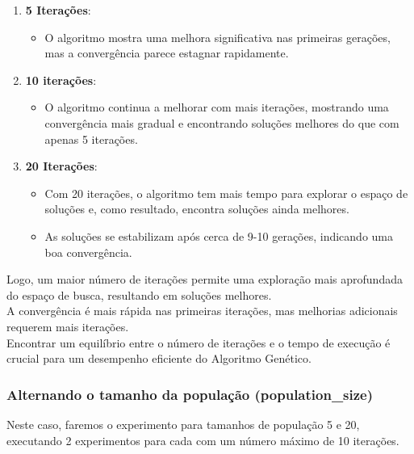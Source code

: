 \documentclass[a4paper, 12pt]{article}
\begin{document}
\begin{enumerate}
    \item \textbf{5 Iterações}:
    \begin{itemize}
        \item O algoritmo mostra uma melhora significativa nas primeiras gerações, mas a convergência parece estagnar rapidamente.
    \end{itemize}
    \item \textbf{10 iterações}:
    \begin{itemize}
        \item O algoritmo continua a melhorar com mais iterações, mostrando uma convergência mais gradual e encontrando soluções melhores do que com apenas 5 iterações.
    \end{itemize}
    \item \textbf{20 Iterações}:
        \begin{itemize}
            \item Com 20 iterações, o algoritmo tem mais tempo para explorar o espaço de soluções e, como resultado, encontra soluções ainda melhores.
            \item As soluções se estabilizam após cerca de 9-10 gerações, indicando uma boa convergência.
        \end{itemize}
\end{enumerate}



Logo, um maior número de iterações permite uma exploração mais aprofundada do espaço de busca, resultando em soluções melhores.\\

A convergência é mais rápida nas primeiras iterações, mas melhorias adicionais requerem mais iterações.\\

Encontrar um equilíbrio entre o número de iterações e o tempo de execução é crucial para um desempenho eficiente do Algoritmo Genético.



\newpage
\subsubsection{Alternando o tamanho da população (population\_size)}

Neste caso, faremos o experimento para tamanhos de população 5 e 20, executando 2 experimentos para cada com um número máximo de 10 iterações.
\end{document}
